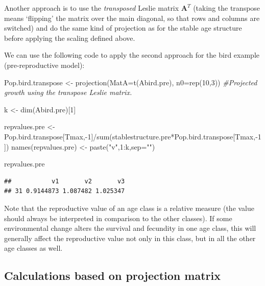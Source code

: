 \documentclass[
]{book}
\newenvironment{Shaded}{\begin{snugshade}}{\end{snugshade}}
\newcommand{\AttributeTok}[1]{\textcolor[rgb]{0.77,0.63,0.00}{#1}}
\newcommand{\CommentTok}[1]{\textcolor[rgb]{0.56,0.35,0.01}{\textit{#1}}}
\newcommand{\DecValTok}[1]{\textcolor[rgb]{0.00,0.00,0.81}{#1}}
\newcommand{\FunctionTok}[1]{\textcolor[rgb]{0.00,0.00,0.00}{#1}}
\newcommand{\NormalTok}[1]{#1}
\newcommand{\OtherTok}[1]{\textcolor[rgb]{0.56,0.35,0.01}{#1}}
\newcommand{\SpecialCharTok}[1]{\textcolor[rgb]{0.00,0.00,0.00}{#1}}
\newcommand{\StringTok}[1]{\textcolor[rgb]{0.31,0.60,0.02}{#1}}
\begin{document}
Another approach is to use the \emph{transposed} Leslie matrix \(\mathbf{A}^T\) (taking the transpose means `flipping' the matrix over the main diagonal, so that rows and columns are switched) and do the same kind of projection as for the stable age structure before applying the scaling defined above.

We can use the following code to apply the second approach for the bird example (pre-reproductive model):

\begin{Shaded}
\begin{Highlighting}[]
\NormalTok{Pop.bird.transpose }\OtherTok{\textless{}{-}} \FunctionTok{projection}\NormalTok{(}\AttributeTok{MatA=}\FunctionTok{t}\NormalTok{(Abird.pre), }\AttributeTok{n0=}\FunctionTok{rep}\NormalTok{(}\DecValTok{10}\NormalTok{,}\DecValTok{3}\NormalTok{)) }\CommentTok{\#Projected growth using the transpose Leslie matrix.}

\NormalTok{k }\OtherTok{\textless{}{-}} \FunctionTok{dim}\NormalTok{(Abird.pre)[}\DecValTok{1}\NormalTok{]}

\NormalTok{repvalues.pre }\OtherTok{\textless{}{-}}\NormalTok{ Pop.bird.transpose[Tmax,}\SpecialCharTok{{-}}\DecValTok{1}\NormalTok{]}\SpecialCharTok{/}\FunctionTok{sum}\NormalTok{(stablestructure.pre}\SpecialCharTok{*}\NormalTok{Pop.bird.transpose[Tmax,}\SpecialCharTok{{-}}\DecValTok{1}\NormalTok{])}
\FunctionTok{names}\NormalTok{(repvalues.pre) }\OtherTok{\textless{}{-}} \FunctionTok{paste}\NormalTok{(}\StringTok{"v"}\NormalTok{,}\DecValTok{1}\SpecialCharTok{:}\NormalTok{k,}\AttributeTok{sep=}\StringTok{""}\NormalTok{)}

\NormalTok{repvalues.pre}
\end{Highlighting}
\end{Shaded}

\begin{verbatim}
##           v1       v2       v3
## 31 0.9144873 1.087482 1.025347
\end{verbatim}

Note that the reproductive value of an age class is a relative measure (the value should always be interpreted in comparison to the other classes). If some environmental change alters the survival and fecundity in one age class, this will generally affect the reproductive value not only in this class, but in all the other age classes as well.

\hypertarget{eigen}{%
\subsection{Calculations based on projection matrix}\label{eigen}}
\end{document}

